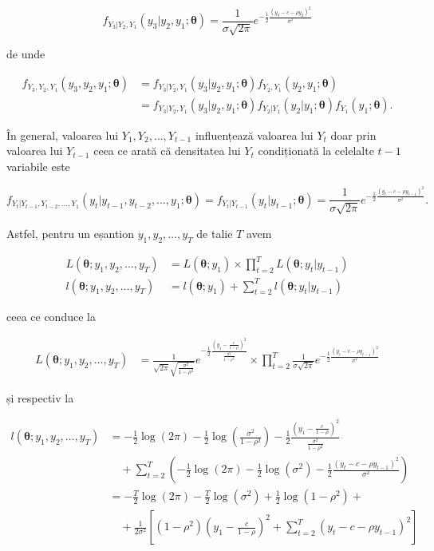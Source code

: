 \documentclass[]{article}
\begin{document}
\[
  f_{Y_3|Y_2,Y_1}(y_3|y_2, y_1;\mathbf{\theta}) = \frac{1}{\sigma\sqrt{2\pi}}e^{-\frac{1}{2}\frac{(y_3 - c -\rho y_2)^2}{\sigma^2}}
\]

de unde

\begin{align*}
  f_{Y_3, Y_2, Y_1}(y_3, y_2, y_1;\mathbf{\theta}) &= f_{Y_3|Y_2,Y_1}(y_3|y_2, y_1;\mathbf{\theta})f_{Y_2,Y_1}(y_2, y_1;\mathbf{\theta})\\
  &= f_{Y_3|Y_2,Y_1}(y_3|y_2, y_1;\mathbf{\theta})f_{Y_2|Y_1}(y_2|y_1;\mathbf{\theta})f_{Y_1}(y_1;\mathbf{\theta}).
\end{align*}

În general, valoarea lui \(Y_1, Y_2, \ldots, Y_{t-1}\) influențează
valoarea lui \(Y_{t}\) doar prin valoarea lui \(Y_{t-1}\) ceea ce arată
că densitatea lui \(Y_{t}\) condiționată la celelalte \(t-1\) variabile
este

\[
  f_{Y_t|Y_{t-1}, Y_{t-2},\ldots, Y_1}(y_t|y_{t-1}, y_{t-2},\ldots, y_1;\mathbf{\theta}) = f_{Y_t|Y_{t-1}}(y_t|y_{t-1};\mathbf{\theta}) = \frac{1}{\sigma\sqrt{2\pi}}e^{-\frac{1}{2}\frac{(y_t - c -\rho y_{t-1})^2}{\sigma^2}}.
\]

Astfel, pentru un eșantion \(y_1,y_2,\ldots,y_T\) de talie \(T\) avem

\begin{align*}
 L(\mathbf{\theta};y_1,y_2,\ldots,y_T) &= L(\mathbf{\theta};y_1)\times\prod_{t = 2}^{T}L(\mathbf{\theta};y_t|y_{t-1})\\
 l(\mathbf{\theta};y_1,y_2,\ldots,y_T) &= l(\mathbf{\theta};y_1)+\sum_{t = 2}^{T}l(\mathbf{\theta};y_t|y_{t-1})
\end{align*}

ceea ce conduce la

\begin{align*}
 L(\mathbf{\theta};y_1,y_2,\ldots,y_T) &= \frac{1}{\sqrt{2\pi}\sqrt{\frac{\sigma^2}{1-\rho^2}}}e^{-\frac{1}{2}\frac{\left(y_1 - \frac{c}{1-\rho}\right)^2}{\frac{\sigma^2}{1-\rho^2}}}\times\prod_{t = 2}^{T}\frac{1}{\sigma\sqrt{2\pi}}e^{-\frac{1}{2}\frac{\left(y_t - c-\rho y_{t-1}\right)^2}{\sigma^2}}
\end{align*}

și respectiv la

\begin{align*}
 l(\mathbf{\theta};y_1,y_2,\ldots,y_T) &= -\frac{1}{2}\log(2\pi) - \frac{1}{2}\log\left(\frac{\sigma^2}{1-\rho^2}\right) -\frac{1}{2}\frac{\left(y_1 - \frac{c}{1-\rho}\right)^2}{\frac{\sigma^2}{1-\rho^2}}\\
       &\quad +\sum_{t = 2}^{T}\left(-\frac{1}{2}\log(2\pi) - \frac{1}{2}\log\left(\sigma^2\right)-\frac{1}{2}\frac{\left(y_t - c-\rho y_{t-1}\right)^2}{\sigma^2}\right)\\
       &= -\frac{T}{2}\log(2\pi) -\frac{T}{2}\log(\sigma^2) + \frac{1}{2}\log(1-\rho^2) +\\
       &\quad+\frac{1}{2\sigma^2}\left[(1-\rho^2)\left(y_1 - \frac{c}{1-\rho}\right)^2 + \sum_{t = 2}^{T}\left(y_t - c-\rho y_{t-1}\right)^2\right]
\end{align*}
\end{document}
